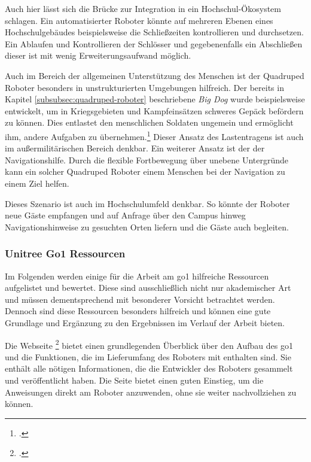 Auch hier lässt sich die Brücke zur Integration in ein Hochschul-Ökosystem schlagen.
Ein automatisierter Roboter könnte auf mehreren Ebenen eines Hochschulgebäudes beispielsweise die Schließzeiten kontrollieren und durchsetzen.
Ein Ablaufen und Kontrollieren der Schlösser und gegebenenfalls ein Abschließen dieser ist mit wenig Erweiterungsaufwand möglich.


Auch im Bereich der allgemeinen Unterstützung des Menschen ist der Quadruped Roboter besonders in unstrukturierten Umgebungen
hilfreich.
Der bereits in Kapitel \ref{subsubsec:quadruped-roboter} beschriebene \emph{Big Dog} wurde beispielsweise entwickelt, um
in Kriegsgebieten und Kampfeinsätzen schweres Gepäck befördern zu können.
Dies entlastet den menschlichen Soldaten ungemein und ermöglicht ihm, andere Aufgaben zu übernehmen.\footcite{bigdog}
Dieser Ansatz des Lastentragens ist auch im außermilitärischen Bereich denkbar.
Ein weiterer Ansatz ist der der Navigationshilfe.
Durch die flexible Fortbewegung über unebene Untergründe kann ein solcher Quadruped Roboter einem Menschen bei der Navigation
zu einem Ziel helfen.

Dieses Szenario ist auch im Hochschulumfeld denkbar.
So könnte der Roboter neue Gäste empfangen und auf Anfrage über den Campus hinweg Navigationshinweise zu gesuchten Orten liefern und die Gäste auch begleiten.

\subsubsection{Unitree Go1 Ressourcen}
\label{subsubsec:ressourcen}

Im Folgenden werden einige für die Arbeit am \gls{go1} hilfreiche Ressourcen aufgelistet und bewertet.
Diese sind ausschließlich nicht nur akademischer Art und müssen dementsprechend mit besonderer Vorsicht betrachtet werden.
Dennoch sind diese Ressourcen besonders hilfreich und können eine gute Grundlage und Ergänzung zu den Ergebnissen im Verlauf der Arbeit bieten.


Die Webseite \footcite{unitree_tutorials} bietet einen grundlegenden Überblick über den Aufbau
des \gls{go1} und die Funktionen, die im Lieferumfang des Roboters mit enthalten sind.
Sie enthält alle nötigen Informationen, die die Entwickler des Roboters gesammelt und veröffentlicht haben.
Die Seite bietet einen guten Einstieg, um die Anweisungen direkt am Roboter anzuwenden, ohne sie weiter nachvollziehen zu können.


